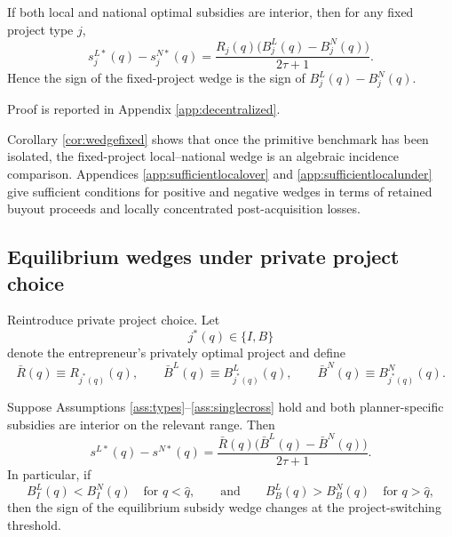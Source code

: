\begin{corollary}\label{cor:wedgefixed}
If both local and national optimal subsidies are interior, then for any fixed project type $j$,
\begin{equation}\label{eq:wedgefixed}
    s_j^{L*}(q)-s_j^{N*}(q)
    =
    \frac{R_j(q)\bigl(B_j^L(q)-B_j^N(q)\bigr)}{2\tau+1}.
\end{equation}
Hence the sign of the fixed-project wedge is the sign of $B_j^L(q)-B_j^N(q)$.
\end{corollary}

Proof is reported in Appendix \ref{app:decentralized}.

Corollary \ref{cor:wedgefixed} shows that once the primitive benchmark has been isolated, the fixed-project local--national wedge is an algebraic incidence comparison. Appendices \ref{app:sufficientlocalover} and \ref{app:sufficientlocalunder} give sufficient conditions for positive and negative wedges in terms of retained buyout proceeds and locally concentrated post-acquisition losses.

\subsection{Equilibrium wedges under private project choice}

Reintroduce private project choice. Let
\begin{equation}
    j^*(q)\in\{I,B\}
\end{equation}
denote the entrepreneur's privately optimal project and define
\begin{equation}
    \bar R(q)\equiv R_{j^*(q)}(q),
    \qquad
    \bar B^L(q)\equiv B_{j^*(q)}^L(q),
    \qquad
    \bar B^N(q)\equiv B_{j^*(q)}^N(q).
\end{equation}

\begin{corollary}\label{cor:wedgeequilibrium}
Suppose Assumptions \ref{ass:types}--\ref{ass:singlecross} hold and both planner-specific subsidies are interior on the relevant range. Then
\begin{equation}\label{eq:wedgeequilibrium}
    s^{L*}(q)-s^{N*}(q)
    =
    \frac{\bar R(q)\bigl(\bar B^L(q)-\bar B^N(q)\bigr)}{2\tau+1}.
\end{equation}
In particular, if
\begin{equation}
    B_I^L(q)<B_I^N(q)
    \quad\text{for } q<\hat q,
    \qquad\text{and}\qquad
    B_B^L(q)>B_B^N(q)
    \quad\text{for } q>\hat q,
\end{equation}
then the sign of the equilibrium subsidy wedge changes at the project-switching threshold.
\end{corollary}


